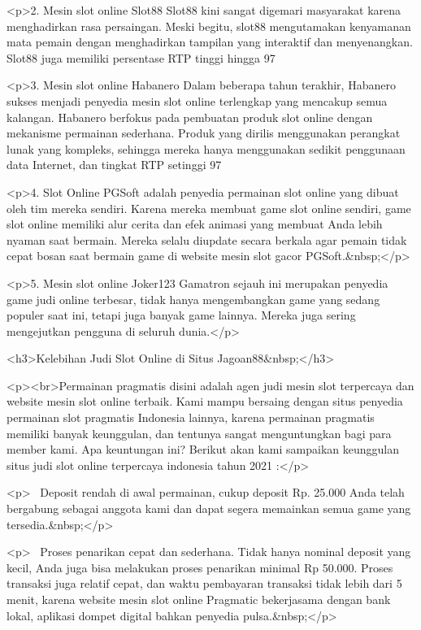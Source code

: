 {<p>2. Mesin slot online Slot88 Slot88 kini sangat digemari masyarakat karena menghadirkan rasa persaingan. Meski begitu, slot88 mengutamakan kenyamanan mata pemain dengan menghadirkan tampilan yang interaktif dan menyenangkan. Slot88 juga memiliki persentase RTP tinggi hingga 97%



<p>3. Mesin slot online Habanero Dalam beberapa tahun terakhir, Habanero sukses menjadi penyedia mesin slot online terlengkap yang mencakup semua kalangan. Habanero berfokus pada pembuatan produk slot online dengan mekanisme permainan sederhana. Produk yang dirilis menggunakan perangkat lunak yang kompleks, sehingga mereka hanya menggunakan sedikit penggunaan data Internet, dan tingkat RTP setinggi 97%



<p>4. Slot Online PGSoft adalah penyedia permainan slot online yang dibuat oleh tim mereka sendiri. Karena mereka membuat game slot online sendiri, game slot online memiliki alur cerita dan efek animasi yang membuat Anda lebih nyaman saat bermain. Mereka selalu diupdate secara berkala agar pemain tidak cepat bosan saat bermain game di website mesin slot gacor PGSoft.&nbsp;</p>



<p>5. Mesin slot online Joker123 Gamatron sejauh ini merupakan penyedia game judi online terbesar, tidak hanya mengembangkan game yang sedang populer saat ini, tetapi juga banyak game lainnya. Mereka juga sering mengejutkan pengguna di seluruh dunia.</p>



<h3>Kelebihan Judi Slot Online di Situs Jagoan88&nbsp;</h3>



<p><br>Permainan pragmatis disini adalah agen judi mesin slot terpercaya dan website mesin slot online terbaik. Kami mampu bersaing dengan situs penyedia permainan slot pragmatis Indonesia lainnya, karena permainan pragmatis memiliki banyak keunggulan, dan tentunya sangat menguntungkan bagi para member kami. Apa keuntungan ini? Berikut akan kami sampaikan keunggulan situs judi slot online terpercaya indonesia tahun 2021 :</p>



<p>~ Deposit rendah di awal permainan, cukup deposit Rp. 25.000 Anda telah bergabung sebagai anggota kami dan dapat segera memainkan semua game yang tersedia.&nbsp;</p>



<p>~ Proses penarikan cepat dan sederhana. Tidak hanya nominal deposit yang kecil, Anda juga bisa melakukan proses penarikan minimal Rp 50.000. Proses transaksi juga relatif cepat, dan waktu pembayaran transaksi tidak lebih dari 5 menit, karena website mesin slot online Pragmatic bekerjasama dengan bank lokal, aplikasi dompet digital bahkan penyedia pulsa.&nbsp;</p>



}
